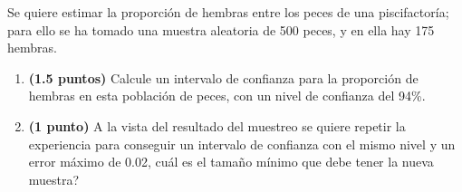 
Se quiere estimar la proporción de hembras entre los peces de una piscifactoría; para ello se ha tomado una muestra aleatoria de 500 peces, y en ella hay 175 hembras.
\begin{enumerate}[label=\alph*)]
\item \textbf{(1.5 puntos)} Calcule un intervalo de confianza para la proporción de hembras en esta población de peces, con un nivel de confianza del 94\%.
\item \textbf{(1 punto)} A la vista del resultado del muestreo se quiere repetir la experiencia para conseguir un intervalo de confianza con el mismo nivel y un error máximo de 0.02, \textquestiondown{}cuál es el tamaño mínimo que debe tener la nueva muestra?
\end{enumerate}
